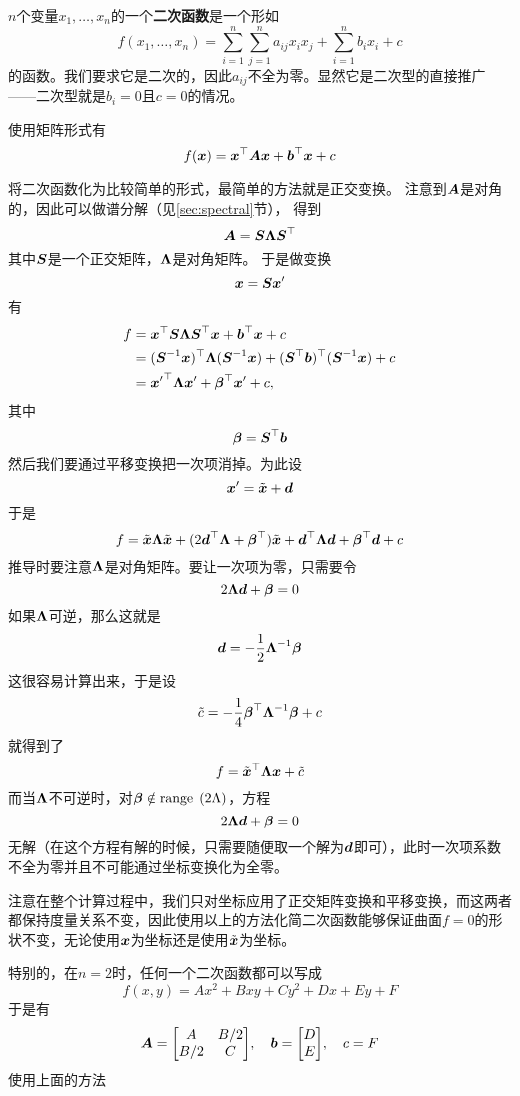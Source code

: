 \documentclass[UTF8]{ctexart}
\newcommand*{\range}{\mathrm{range}\;}
\theoremstyle{definition}
\begin{document}
$n$个变量$x_1, \ldots, x_n$的一个\textbf{二次函数}是一个形如
\[
f(x_1, \ldots, x_n) = \sum_{i=1}^n \sum_{j=1}^n a_{ij}x_i x_j + \sum_{i=1}^n b_i x_i + c
\]
的函数。我们要求它是二次的，因此$a_{ij}$不全为零。显然它是二次型的直接推广——二次型就是$b_i=0$且$c=0$的情况。

使用矩阵形式有
\[
f(\vb*{x}) = \vb*{x}^\top \vb*{A} \vb*{x} + \vb*{b}^\top \vb*{x} + c
\]

将二次函数化为比较简单的形式，最简单的方法就是正交变换。
注意到$\vb*{A}$是对角的，因此可以做谱分解（见\ref{sec:spectral}节），
得到
\[
    \vb*{A} = \vb*{S} \vb*{\Lambda} \vb*{S}^\top
\]
其中$\vb*{S}$是一个正交矩阵，$\vb*{\Lambda}$是对角矩阵。
于是做变换
\[
    \vb*{x} = \vb*{S} \vb*{x}'
\]
有
\[
    \begin{aligned}
        f &= \vb*{x}^\top \vb*{S} \vb*{\Lambda} \vb*{S}^\top \vb*{x} + \vb*{b}^\top \vb*{x} + c \\
        &= (\vb*{S}^{-1} \vb*{x})^\top \vb*{\Lambda} (\vb*{S}^{-1} \vb*{x}) + (\vb*{S}^\top \vb*{b})^\top (\vb*{S}^{-1} \vb*{x}) + c \\
        &= {\vb*{x}'}^\top \vb*{\Lambda} \vb*{x}' + \vb*{\beta}^\top \vb*{x}' + c,
    \end{aligned}
\]
其中
\[
    \vb*{\beta} = \vb*{S}^\top \vb*{b}
\]
然后我们要通过平移变换把一次项消掉。为此设
\[
    \vb*{x}' = \tilde{\vb*{x}} + \vb*{d}
\]
于是
\[
    f = \tilde{\vb*{x}} \vb*{\Lambda} \tilde{\vb*{x}} + (2 \vb*{d}^\top \vb*{\Lambda} + \vb*{\beta}^\top) \tilde{\vb*{x}} + \vb*{d}^\top \vb*{\Lambda} \vb*{d} + \vb*{\beta}^\top \vb*{d} + c
\]
推导时要注意$\vb*{\Lambda}$是对角矩阵。要让一次项为零，只需要令
\[
    2 \vb*{\Lambda} \vb*{d} + \vb*{\beta} = 0
\]
如果$\vb*{\Lambda}$可逆，那么这就是
\[
    \vb*{d} = - \frac{1}{2} \vb*{\Lambda}^{-1} \vb*{\beta}
\]
这很容易计算出来，于是设
\[
    \tilde{c} = -\frac{1}{4} \vb*{\beta}^\top \vb*{\Lambda}^{-1} \vb*{\beta} + c
\]
就得到了
\[
    f = \tilde{\vb*{x}}^\top \vb*{\Lambda} \vb*{x} + \tilde{c}
\]
而当$\vb*{\Lambda}$不可逆时，对$\vb*{\beta} \notin \range\left(2\Lambda\right)$，方程
\[
    2 \vb*{\Lambda} \vb*{d} + \vb*{\beta} = 0
\]
无解（在这个方程有解的时候，只需要随便取一个解为$\vb*{d}$即可），此时一次项系数不全为零并且不可能通过坐标变换化为全零。

注意在整个计算过程中，我们只对坐标应用了正交矩阵变换和平移变换，而这两者都保持度量关系不变，因此使用以上的方法化简二次函数能够保证曲面$f=0$的形状不变，无论使用$\vb*{x}$为坐标还是使用$\tilde{\vb*{x}}$为坐标。

特别的，在$n=2$时，任何一个二次函数都可以写成
\[
    f(x, y) = Ax^2 + Bxy + Cy^2 + Dx + Ey + F
\]
于是有
\[
    \vb*{A} = \mqty[A & B/2 \\ B/2 & C], \quad \vb*{b} = \mqty[D \\ E], \quad c = F
\]
使用上面的方法
\end{document}
